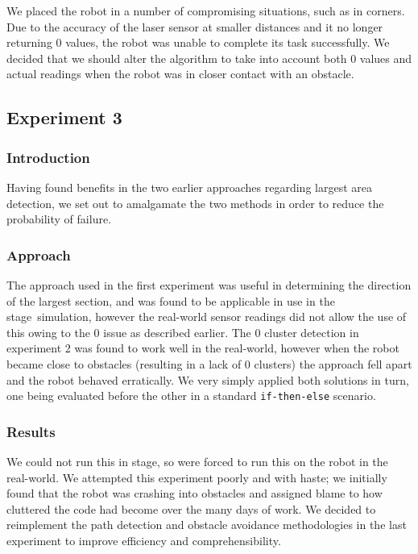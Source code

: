 \documentclass[twocolumn,11pt]{article}
\newcommand{\stage}{\textsf{stage}}
\begin{document}
We placed the robot in a number of compromising situations, such as in corners. Due to the accuracy of the laser sensor at smaller distances and it no longer returning $0$ values, the robot was unable to complete its task successfully. We decided that we should alter the algorithm to take into account both $0$ values and actual readings when the robot was in closer contact with an obstacle.

\subsection{Experiment 3}

\subsubsection{Introduction}

Having found benefits in the two earlier approaches regarding largest area detection, we set out to amalgamate the two methods in order to reduce the probability of failure.

\subsubsection{Approach}

The approach used in the first experiment was useful in determining the direction of the largest section, and was found to be applicable in use in the \stage\ simulation, however the real-world sensor readings did not allow the use of this owing to the $0$ issue as described earlier. The $0$ cluster detection in experiment 2 was found to work well in the real-world, however when the robot became close to obstacles (resulting in a lack of $0$ clusters) the approach fell apart and the robot behaved erratically. We very simply applied both solutions in turn, one being evaluated before the other in a standard \texttt{if-then-else} scenario.

\subsubsection{Results}

We could not run this in \stage, so were forced to run this on the robot in the real-world. We attempted this experiment poorly and with haste; we initially found that the robot was crashing into obstacles and assigned blame to how cluttered the code had become over the many days of work. We decided to reimplement the path detection and obstacle avoidance methodologies in the last experiment to improve efficiency and comprehensibility.
\end{document}

